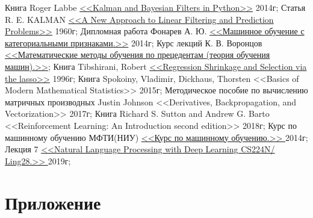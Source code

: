 \documentclass[a4paper,11pt]{article} %
\begin{document}
	
	
	\begin{thebibliography}{7}
	 Книга Roger Labbe  \href{https://github.com/rlabbe/Kalman-and-Bayesian-Filters-in-Python}{ <<Kalman and Bayesian Filters in Python>>} 2014г;
	 Статья  R. E. KALMAN \href{http://www.cs.unc.edu/~welch/kalman/media/pdf/Kalman1960.pdf}{<<A New Approach to Linear Filtering and Prediction Problems>>} 1960г;
	 Дипломная работа Фонарев А. Ю. \href{http://www.machinelearning.ru/wiki/images/9/99/Diploma_fonarev.pdf}{<<Машинное обучение с категориальными признаками.>>} 2014г;
	  Курс лекций К. В. Воронцов \href{http://www.machinelearning.ru/wiki/images/6/6d/Voron-ML-1.pdf}{<<Математические методы обучения по прецедентам (теория обучения машин).>>};
	Книга Tibshirani, Robert  \href{https://www.researchgate.net/publication/228781252_Regression_shrinkage_and_selection_via_the_elastic_net_with_applications_to_microarrays}{<<Regression Shrinkage and Selection via the lasso>>} 1996г;
	Книга Spokoiny, Vladimir, Dickhaus, Thorsten <<Basics of Modern Mathematical Statistics>> 2015г;
	Методическое  пособие по вычислению матричных производных Justin Johnson <<Derivatives, Backpropagation, and Vectorization>> 2017г;
	Книга Richard S. Sutton and Andrew G. Barto <<Reinforcement Learning: An Introduction second edition>> 2018г;
	 Курс по машинному обучению МФТИ(НИУ)  \href{https://github.com/girafe-ai/ml-mipt}{<<Курс по машинному обучению.>> } 2014г;
	 Лекция  7  \href{https://web.stanford.edu/class/cs224n/slides/cs224n-2019-lecture07-fancy-rnn.pdf}{<<Natural Language Processing with Deep Learning CS224N/ Ling28.>> } 2019г;
	\end{thebibliography}
	
\section{Приложение}
\label{appendix}
\end{document}
